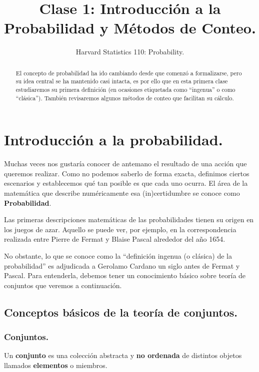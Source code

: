 \documentclass[12pt]{article}
\title{Clase 1: Introducción a la Probabilidad y Métodos de Conteo.}
\author{Harvard Statistics 110: Probability.}
\date{}
\begin{document}
\maketitle

\begin{abstract}
\noindent El concepto de probabilidad ha ido cambiando desde que comenzó a formalizarse, pero su idea central se ha mantenido casi intacta, es por ello que en esta primera clase estudiaremos su primera definición (en ocasiones etiquetada como ``ingenua'' o como ``clásica''). También revisaremos algunos métodos de conteo que facilitan su cálculo.
\end{abstract}


\section{Introducción a la probabilidad.}

Muchas veces nos gustaría conocer de antemano el resultado de una acción que queremos realizar. Como no podemos saberlo de forma exacta, definimos ciertos escenarios y establecemos qué tan posible es que cada uno ocurra. El área de la matemática que describe numéricamente esa (in)certidumbre se conoce como \textbf{Probabilidad}.

Las primeras descripciones matemáticas de las probabilidades tienen su origen en los juegos de azar. Aquello se puede ver, por ejemplo, en la correspondencia realizada entre Pierre de Fermat y Blaise Pascal alrededor del año 1654.

No obstante, lo que se conoce como la ``definición ingenua (o clásica) de la probabilidad'' es adjudicada a Gerolamo Cardano un siglo antes de Fermat y Pascal. Para entenderla, debemos tener un conocimiento básico sobre teoría de conjuntos que veremos a continuación.

\subsection{Conceptos básicos de la teoría de conjuntos.}

\subsubsection{Conjuntos.}

Un \textbf{conjunto} es una colección abstracta y \textbf{no ordenada} de distintos objetos llamados \textbf{elementos} o miembros.
\end{document}
